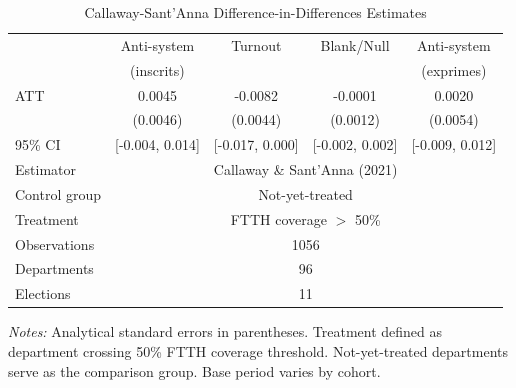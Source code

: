 \begin{table}[htbp]
\centering
\caption{Callaway-Sant'Anna Difference-in-Differences Estimates}
\label{tab:csdid}
\begin{tabular}{lcccc}
\hline\hline
& Anti-system & Turnout & Blank/Null & Anti-system \\
& (inscrits) & & & (exprimes) \\
\hline
ATT & 0.0045 & -0.0082 & -0.0001 & 0.0020 \\
& (0.0046) & (0.0044) & (0.0012) & (0.0054) \\
95\% CI & [-0.004, 0.014] & [-0.017, 0.000] & [-0.002, 0.002] & [-0.009, 0.012] \\
\hline
Estimator & \multicolumn{4}{c}{Callaway \& Sant'Anna (2021)} \\
Control group & \multicolumn{4}{c}{Not-yet-treated} \\
Treatment & \multicolumn{4}{c}{FTTH coverage $>$ 50\%} \\
Observations & \multicolumn{4}{c}{1056} \\
Departments & \multicolumn{4}{c}{96} \\
Elections & \multicolumn{4}{c}{11} \\
\hline\hline
\end{tabular}
\begin{minipage}{0.9\textwidth}
\vspace{0.3em}
\footnotesize \emph{Notes:} Analytical standard errors in parentheses. Treatment defined as department crossing 50\% FTTH coverage threshold. Not-yet-treated departments serve as the comparison group. Base period varies by cohort.
\end{minipage}
\end{table}
